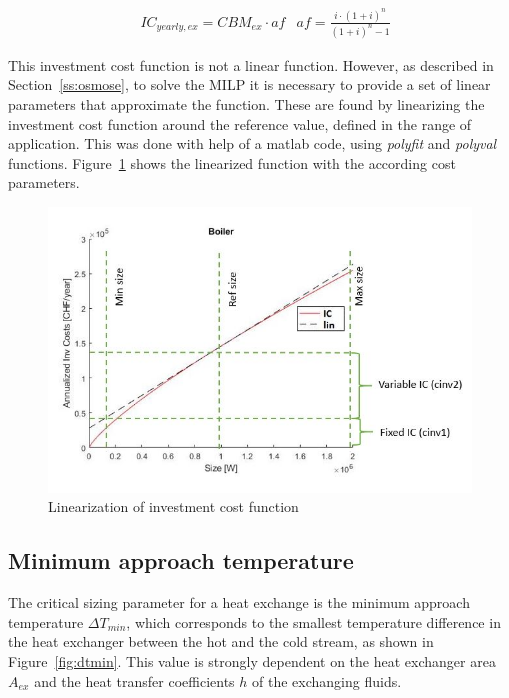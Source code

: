 \documentclass{article}
\begin{document}
\begin{align}
	& IC_{yearly,ex} = CBM_{ex} \cdot af 
	& af = \frac{i \cdot (1 + i)^n}{(1 + i)^n - 1}
\end{align}

This investment cost function is not a linear function. However, as described in Section~\ref{ss:osmose}, to solve the MILP it is necessary to provide a set of linear parameters that approximate the function. These are found by linearizing the investment cost function around the reference value, defined in the range of application. This was done with help of a matlab code, using \textit{polyfit} and \textit{polyval} functions. Figure~\ref{fig:lin} shows the linearized function with the according cost parameters.

\begin{figure}[htp]
	\centering
	\includegraphics[scale=0.6]{Images/linearization_expl.jpg}
	\caption{Linearization of investment cost function}
	\label{fig:lin}
\end{figure}

\subsection{Minimum approach temperature}\label{ss:dtmin}
The critical sizing parameter for a heat exchange is the minimum approach temperature $\Delta T_{min}$, which corresponds to the smallest temperature difference in the heat exchanger between the hot and the cold stream, as shown in Figure~\ref{fig:dtmin}. This value is strongly dependent on the heat exchanger area $A_{ex}$ and the heat transfer coefficients $h$ of the exchanging fluids. 
\end{document}
